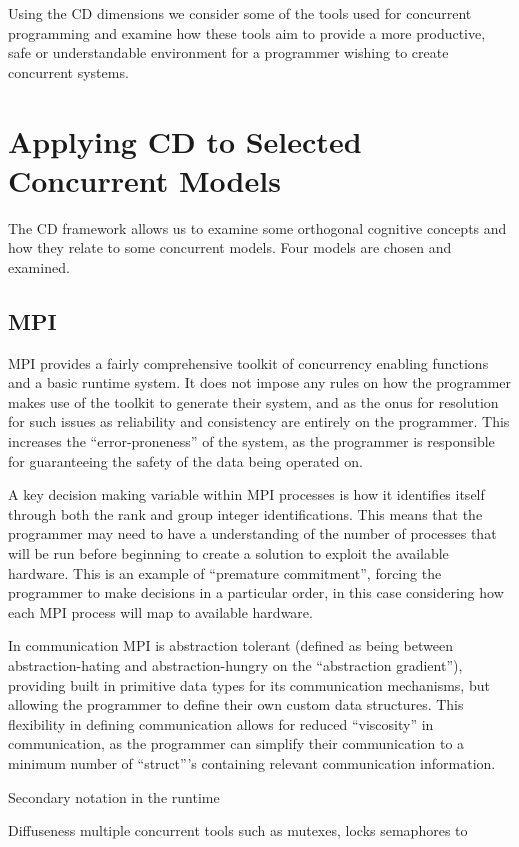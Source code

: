 \documentclass{sig-alternate}
\begin{document}
Using the CD dimensions we consider some of the tools used for concurrent programming and examine how these tools aim to provide a more productive, safe or understandable environment for a programmer wishing to create concurrent systems.

\section{Applying CD to Selected Concurrent Models}
The CD framework allows us to examine some orthogonal cognitive concepts and how they relate to some concurrent models. Four models are chosen and examined.

\subsection{MPI}
MPI provides a fairly comprehensive toolkit of concurrency enabling functions and a basic runtime system. It does not impose any rules on how the programmer makes use of the toolkit to generate their system, and as the onus for resolution for such issues as reliability and consistency are entirely on the programmer. This increases the ``error-proneness'' of the system, as the programmer is responsible for guaranteeing the safety of the data being operated on.

A key decision making variable within MPI processes is how it identifies itself through both the rank and group integer identifications. This means that the programmer may need to have a understanding of the number of processes that will be run before beginning to create a solution to exploit the available hardware. This is an example of ``premature commitment'', forcing the programmer to make decisions in a particular order, in this case considering how each MPI process will map to available hardware. 

In communication MPI is abstraction tolerant (defined as being between abstraction-hating and abstraction-hungry on the ``abstraction gradient''), providing built in primitive data types for its communication mechanisms, but allowing the programmer to define their own custom data structures. This flexibility in defining communication allows for reduced ``viscosity'' in communication, as the programmer can simplify their communication to a minimum number of ``struct'''s containing relevant communication information.

Secondary notation in the runtime 

Diffuseness multiple concurrent tools such as mutexes, locks semaphores to
\end{document}
